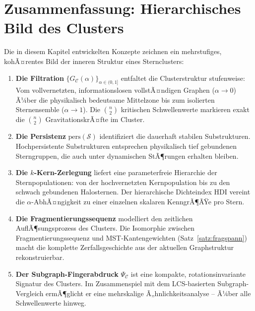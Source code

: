 ﻿\documentclass[a4paper,12pt]{report}
\theoremstyle{definition}
\begin{document}
\section{Zusammenfassung: Hierarchisches Bild des Clusters}
\label{sec:hier_zusammenfassung}

Die in diesem Kapitel entwickelten Konzepte zeichnen ein mehrstufiges, kohÃ¤rentes Bild der inneren Struktur eines Sternclusters:

\begin{enumerate}
    \item \textbf{Die Filtration} $\{G_\mathcal{C}(\alpha)\}_{\alpha \in (0,1]}$ entfaltet die Clusterstruktur stufenweise: Vom vollvernetzten, informationslosen vollstÃ¤ndigen Graphen ($\alpha \to 0$) Ã¼ber die physikalisch bedeutsame Mittelzone bis zum isolierten Sternensemble ($\alpha \to 1$). Die $\binom{n}{2}$ kritischen Schwellenwerte markieren exakt die $\binom{n}{2}$ GravitationskrÃ¤fte im Cluster.
    \item \textbf{Die Persistenz} $\mathrm{pers}(\mathcal{S})$ identifiziert die dauerhaft stabilen Substrukturen. Hochpersistente Substrukturen entsprechen physikalisch tief gebundenen Sterngruppen, die auch unter dynamischen StÃ¶rungen erhalten bleiben.
    \item \textbf{Die $k$-Kern-Zerlegung} liefert eine parameterfreie Hierarchie der Sternpopulationen: von der hochvernetzten Kernpopulation bis zu den schwach gebundenen Halosternen. Der hierarchische Dichteindex HDI vereint die $\alpha$-AbhÃ¤ngigkeit zu einer einzelnen skalaren KenngrÃ¶ÃŸe pro Stern.
    \item \textbf{Die Fragmentierungssequenz} modelliert den zeitlichen AuflÃ¶sungsprozess des Clusters. Die Isomorphie zwischen Fragmentierungssequenz und MST-Kantengewichten (Satz~\ref{satz:fragspann}) macht die komplette Zerfallsgeschichte aus der aktuellen Graphstruktur rekonstruierbar.
    \item \textbf{Der Subgraph-Fingerabdruck} $\Psi_\mathcal{C}$ ist eine kompakte, rotationsinvariante Signatur des Clusters. Im Zusammenspiel mit dem LCS-basierten Subgraph-Vergleich ermÃ¶glicht er eine mehrskalige Ã„hnlichkeitsanalyse -- Ã¼ber alle Schwellenwerte hinweg.
\end{enumerate}
\end{document}
